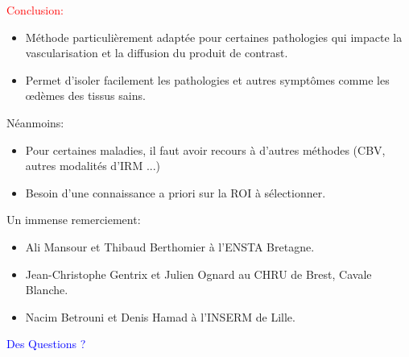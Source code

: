 \documentclass{beamer}
\begin{document}

\begin{frame}

\textcolor{red}{Conclusion:}

\begin{itemize}
\item Méthode particulièrement adaptée pour certaines pathologies qui impacte la vascularisation et la diffusion du produit de contrast.
\item Permet d'isoler facilement les pathologies et autres symptômes comme les œdèmes des tissus sains.
\end{itemize}

Néanmoins:

\begin{itemize}
\item Pour certaines maladies, il faut avoir recours à d'autres méthodes (CBV, autres modalités d'IRM ...)
\item Besoin d'une connaissance a priori sur la ROI à sélectionner.
\end{itemize}


\end{frame}



\begin{frame}

Un immense remerciement:

\begin{itemize}
\item Ali Mansour et Thibaud Berthomier à l'ENSTA Bretagne.
\item Jean-Christophe Gentrix et Julien Ognard au CHRU de Brest, Cavale Blanche.
\item Nacim Betrouni et Denis Hamad à l'INSERM de Lille.
\end{itemize}

\end{frame}

\begin{frame}

\begin{center}
\textcolor{blue}{\Huge Des Questions ?}
\end{center}

\end{frame}
\end{document}
